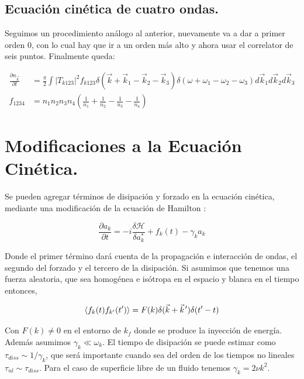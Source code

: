 \subsection*{Ecuación cinética de cuatro ondas.}
Seguimos un procedimiento análogo al anterior, nuevamente va a dar a primer orden 0, con lo cual hay que ir a un orden más alto y ahora usar el correlator de seis puntos. Finalmente queda:

\begin{equation}
	\begin{split}
		\frac{\partial n_{\vec k}}{\partial t} &= \frac{\pi}{2} \int |T_{k123}|^2 f_{k123} \delta(\vec k + \vec k_1 - \vec k_2 -\vec k_3) \delta(\omega + \omega_1 -\omega_2 - \omega_3) d\vec k_1 d\vec k_2 d\vec k_3 \\
		f_{1234} &= n_1n_2n_3n_4\left(\frac{1}{n_1} + \frac{1}{n_2} - \frac{1}{n_3} - \frac{1}{n_4} \right)
	\end{split}
\end{equation}


\section{Modificaciones a la Ecuación Cinética.}
Se pueden agregar términos de disipación y forzado en la ecuación cinética, mediante una modificación de la ecuación de Hamilton \cite{falkovichTurbulence2006, falconLaboratoryExperimentsWave2010}:

\begin{equation}
	\frac{\partial a_k}{\partial t} = -i\frac{\delta \mathcal{H}}{\delta a_k^*} + f_k(t) - \gamma_{k}a_k
\end{equation}

Donde el primer término dará cuenta de la propagación e interacción de ondas, el segundo del forzado y el tercero de la disipación. Si asumimos que tenemos una fuerza aleatoria, que sea homogénea e isótropa en el espacio y blanca en el tiempo entonces,

\begin{equation}
	\langle f_k(t)f_{k'}(t') \rangle = F(k) \delta(\vec k+ \pvec k')\delta(t'-t)
\end{equation}

Con $F(k)\neq 0$ en el entorno de $k_f$ donde se produce la inyección de energía. Además asumimos $\gamma_k\ll\omega_k$.  El tiempo de disipación se puede estimar como $\tau_{diss}\sim 1/\gamma_k $, que será importante cuando sea del orden de los tiempos no lineales $\tau_{nl}\sim \tau_{diss}$. Para el caso de superficie libre de un fluido tenemos $\gamma_k = 2\nu k^2$. \cite{deikeEtudesExperimentalesNumeriques2013}

